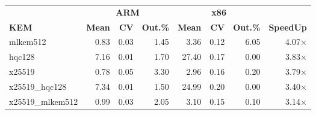 \begin{table}[!ht]
\begin{tabular}{lrrr|rrr|r}
 \toprule
& \multicolumn{3}{c}{\bfseries ARM} & \multicolumn{3}{c}{\bfseries x86} &\\
\cmidrule(lr){2-4} \cmidrule(lr){5-7}
\textbf{KEM} & \textbf{Mean} & \textbf{CV} & \textbf{Out.\%} & \textbf{Mean} & \textbf{CV} & \textbf{Out.\%} & \textbf{SpeedUp}\\
\midrule
mlkem512 & 0.83 & 0.03 & 1.45 & 3.36 & 0.12 & 6.05 & 4.07× \\
hqc128 & 7.16 & 0.01 & 1.70 & 27.40 & 0.17 & 0.00 & 3.83× \\
x25519 & 0.78 & 0.05 & 3.30 & 2.96 & 0.16 & 0.20 & 3.79× \\
x25519_hqc128 & 7.34 & 0.01 & 1.50 & 24.99 & 0.20 & 0.00 & 3.40× \\
x25519_mlkem512 & 0.99 & 0.03 & 2.05 & 3.10 & 0.15 & 0.10 & 3.14× \\
\bottomrule
\end{tabular}
\end{table}
